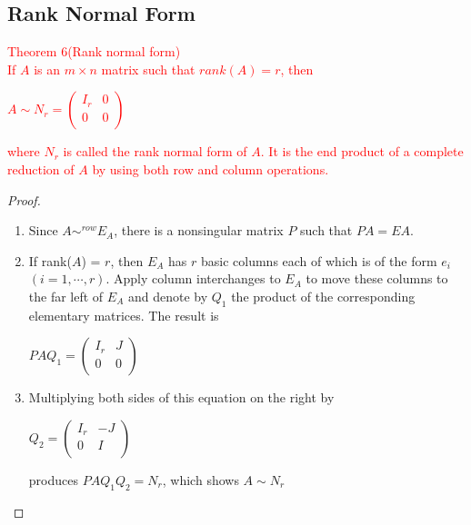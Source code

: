 \documentclass[UTF8,a4paper, 10pt, openany]{book}
\begin{document}
\subsection{Rank Normal Form}
\textcolor{red}{Theorem 6(Rank normal form)\\
If $A$ is an $m\times n$ matrix such that $rank(A) = r$, then
\begin{center}
$A \sim N_r = 
\begin{pmatrix}
I_r & 0 \\
0 & 0 \\
\end{pmatrix}$
\end{center}
where $N_r$ is called the rank normal form of $A$. It is the end product of a complete reduction of $A$ by using both row and column operations.}
\begin{proof}
\begin{enumerate}
\item Since $A \sim ^{row} E_A$, there is a nonsingular matrix $P$ such that $PA = EA$.
\item If rank($A$) = $r$, then $E_A$ has $r$ basic columns each of which is of the form $e_i$ $(i = 1, \cdots , r)$. Apply column interchanges to $E_A$ to move these columns to the far left of $E_A$ and denote by $Q_1$ the product of the corresponding elementary matrices. The result is
\begin{center}
$PAQ_1=
\begin{pmatrix}
I_r & J \\
0 & 0 \\
\end{pmatrix}$
\end{center}
\item Multiplying both sides of this equation on the right by
\begin{center}
$Q_2=
\begin{pmatrix}
I_r & -J \\
0 & I \\
\end{pmatrix}$
\end{center}
produces $PAQ_1Q_2=N_r$, which shows $A\sim N_r$
\end{enumerate}
\end{proof}
\end{document}

